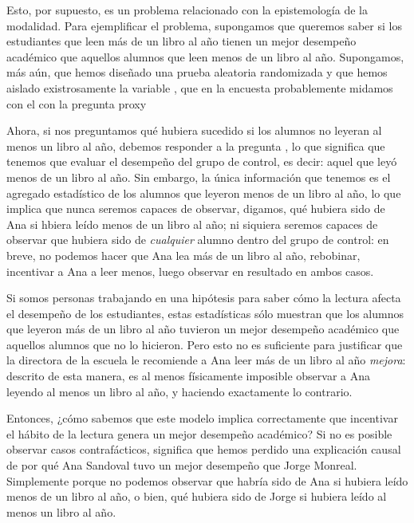 Esto, por supuesto, es un problema relacionado con la epistemología de la modalidad. Para ejemplificar el problema, supongamos que queremos saber si los estudiantes que leen más de un libro al año tienen un mejor desempeño
académico que aquellos alumnos que leen menos de un libro al año.
Supongamos, más aún, que hemos diseñado una prueba aleatoria
randomizada y que hemos aislado existrosamente la variable , que en la encuesta probablemente midamos con
el con la pregunta proxy 

Ahora, si nos preguntamos qué hubiera sucedido si los alumnos no
leyeran al menos un libro al año, debemos responder a la pregunta
, lo que significa que tenemos que
evaluar el desempeño del grupo de control, es decir: aquel que leyó
menos de un libro al año. Sin embargo, la única información que
tenemos es el agregado estadístico de los alumnos que leyeron menos
de un libro al año, lo que implica que nunca seremos capaces de
observar, digamos, qué hubiera sido de Ana si hbiera leído menos de
un libro al año; ni siquiera seremos capaces de observar que hubiera sido
de \emph{cualquier} alumno dentro del grupo de control: en breve, no podemos hacer que Ana lea más de un libro al año, rebobinar, incentivar a Ana a leer menos, luego observar en resultado en ambos casos.

Si somos personas trabajando en una hipótesis para saber cómo la lectura afecta el desempeño de los estudiantes, estas estadísticas sólo muestran que los alumnos que leyeron más de un libro al año tuvieron un mejor desempeño académico que aquellos alumnos que no lo hicieron. Pero esto no es suficiente para justificar que la directora de la escuela le recomiende a Ana leer más de un libro al año \emph{mejora}: descrito de esta manera, es al menos físicamente imposible observar a Ana leyendo al menos un libro al año, y haciendo exactamente lo contrario.

Entonces, ¿cómo sabemos que este modelo implica correctamente que
incentivar el hábito de la lectura genera un mejor desempeño
académico? Si no es posible observar casos contrafácticos, significa
que hemos perdido una explicación causal de por qué Ana Sandoval tuvo
un mejor desempeño que Jorge Monreal. Simplemente porque no podemos
observar que habría sido de Ana si hubiera leído menos de un libro al
año, o bien, qué hubiera sido de Jorge si hubiera leído al menos un
libro al año.


